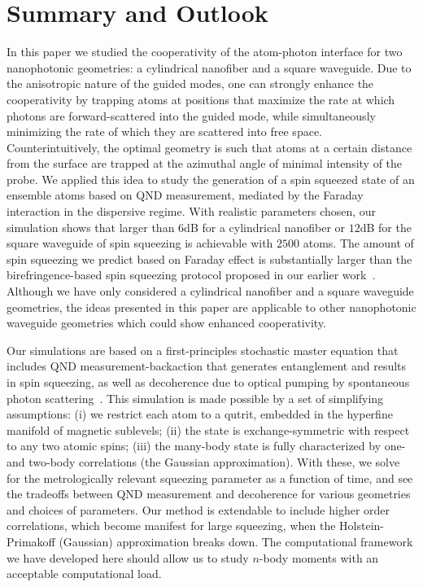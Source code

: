 \documentclass[preprint,aps,pra,onecolumn,superscriptaddress]{revtex4-1} %
\begin{document}
\section{Summary and Outlook}
In this paper we studied the cooperativity of the atom-photon interface for two nanophotonic geometries: a cylindrical nanofiber and a square waveguide.  Due to the anisotropic nature of the guided modes, one can strongly enhance the cooperativity by trapping atoms at positions that maximize the rate at which photons are forward-scattered  into the guided mode, while simultaneously minimizing the rate of which they are scattered into free space.  Counterintuitively, the optimal geometry is such that atoms at a certain distance from the surface are trapped at the azimuthal angle of minimal intensity of the probe.  We applied this idea to study the generation of a spin squeezed state of an ensemble atoms based on QND measurement, mediated by the Faraday interaction in the dispersive regime.   With realistic parameters chosen, our simulation shows that larger than $ 6 $dB for a cylindrical nanofiber or $ 12 $dB for the square waveguide of spin squeezing is achievable with $ 2500 $ atoms. The amount of spin squeezing we predict based on Faraday effect is substantially larger than the birefringence-based spin squeezing protocol proposed in our earlier work~\cite{Qi2016}.  Although we have only considered a cylindrical nanofiber and a square waveguide geometries, the ideas presented in this paper are applicable to other nanophotonic waveguide geometries which could show enhanced cooperativity.

Our simulations are based on a first-principles stochastic master equation that includes QND measurement-backaction that generates entanglement and results in spin squeezing, as well as decoherence due to optical pumping by spontaneous photon scattering~\cite{Norris2014, Baragiola2014, Qi2016}. This simulation is made possible by a set of simplifying assumptions: (i) we restrict each atom to a qutrit, embedded in the hyperfine manifold of magnetic sublevels; (ii) the state is exchange-symmetric with respect to any two atomic spins; (iii) the many-body state is fully characterized by one- and two-body correlations (the Gaussian approximation).   With these, we solve for the metrologically relevant squeezing parameter as a function of time, and see the tradeoffs between QND measurement and decoherence for various geometries and choices of parameters.  Our method is extendable to include higher order correlations, which become manifest for large squeezing, when the Holstein-Primakoff (Gaussian) approximation breaks down.  The computational framework we have developed here should allow us to study $ n $-body moments with an acceptable computational load. 
\end{document}
